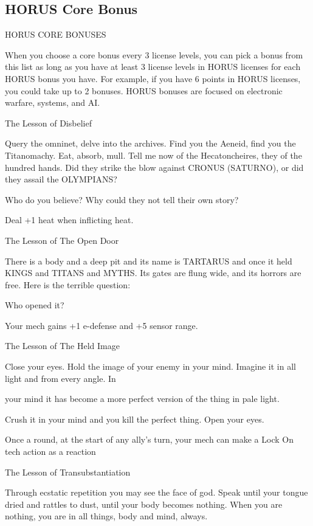 \subsection{HORUS Core Bonus}

                                      HORUS CORE BONUSES

When you choose a core bonus every 3 license levels, you can pick a bonus from this list as long
as you have at least 3 license levels in HORUS licenses for each HORUS bonus you have. For
example, if you have 6 points in HORUS licenses, you could take up to 2 bonuses. HORUS
bonuses are focused on electronic warfare, systems, and AI.


The Lesson of Disbelief

Query the omninet, delve into the archives. Find you the Aeneid, find you the Titanomachy. Eat, absorb,
mull. Tell me now of the Hecatoncheires, they of the hundred hands. Did they strike the blow against
CRONUS (SATURNO), or did they assail the OLYMPIANS?

Who do you believe? Why could they not tell their own story?

Deal +1 heat when inflicting heat.


The Lesson of The Open Door

There is a body and a deep pit and its name is TARTARUS and once it held KINGS and TITANS and
MYTHS. Its gates are flung wide, and its horrors are free. Here is the terrible question:

Who opened it?

Your mech gains +1 e-defense and +5 sensor range.


The Lesson of The Held Image

Close your eyes. Hold the image of your enemy in your mind. Imagine it in all light and from every angle. In

your mind it has become a more perfect version of the thing in pale light.

Crush it in your mind and you kill the perfect thing. Open your eyes.

Once a round, at the start of any ally’s turn, your mech can make a Lock On tech action as a
reaction


The Lesson of Transubstantiation

Through ecstatic repetition you may see the face of god. Speak until your tongue dried and rattles to dust,
until your body becomes nothing. When you are nothing, you are in all things, body and mind, always.

